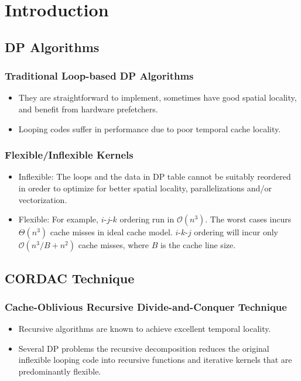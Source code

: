 \section{Introduction}

\subsection{DP Algorithms}
\begin{frame}
    \frametitle{Traditional Loop-based DP Algorithms}
	\begin{itemize}
		\item They are straightforward to implement, 
			sometimes have good spatial locality, and benefit from hardware
			prefetchers.
		\item Looping codes suffer in performance due to poor temporal cache
			locality.
	\end{itemize}
\end{frame}

\begin{frame}
    \frametitle{Flexible/Inflexible Kernels}
	\begin{itemize}
		\item Inflexible: The loops and the data in DP table cannot be suitably
			reordered in oreder to optimize for better spatial locality,
			parallelizations and/or vectorization.
		\item Flexible: For example, $i$-$j$-$k$ ordering run in $\mathcal{O}(n^3)$.
			The worst cases incurs $\Theta(n^3)$ cache misses in ideal cache model.
			$i$-$k$-$j$ ordering will incur only $\mathcal{O}(n^3/B + n^2)$ cache misses,
			where $B$ is the cache line size.
	\end{itemize}
\end{frame}

\subsection{CORDAC Technique}
\begin{frame}
    \frametitle{Cache-Oblivious Recursive Divide-and-Conquer Technique}
	\begin{itemize}
		\item Recursive algorithms are known to achieve excellent temporal locality.
		\item Several DP problems the recursive decomposition reduces the original 
			inflexible looping code into recursive functions and iterative kernels 
			that are predominantly flexible.
	\end{itemize}
\end{frame}

